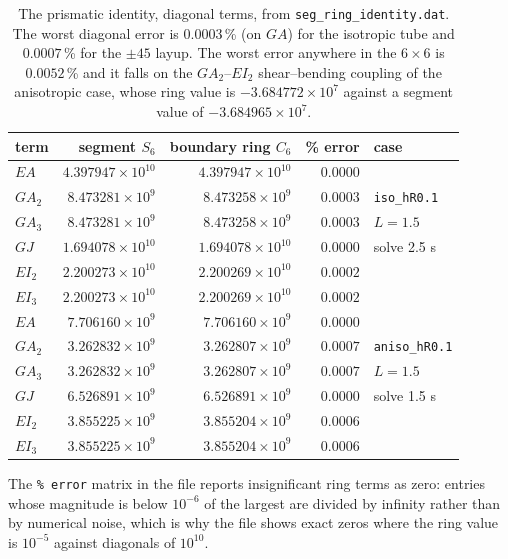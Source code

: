 \begin{table}[htbp]
\centering
\small
\begin{tabular}{lrrrl}
\toprule
term & segment $S_6$ & boundary ring $C_6$ & \% error & case \\
\midrule
$EA$   & $4.397947\times10^{10}$ & $4.397947\times10^{10}$ & $0.0000$ & \\
$GA_2$ & $8.473281\times10^{9}$  & $8.473258\times10^{9}$  & $0.0003$ & \texttt{iso\_hR0.1} \\
$GA_3$ & $8.473281\times10^{9}$  & $8.473258\times10^{9}$  & $0.0003$ & $L=1.5$ \\
$GJ$   & $1.694078\times10^{10}$ & $1.694078\times10^{10}$ & $0.0000$ & solve 2.5 s \\
$EI_2$ & $2.200273\times10^{10}$ & $2.200269\times10^{10}$ & $0.0002$ & \\
$EI_3$ & $2.200273\times10^{10}$ & $2.200269\times10^{10}$ & $0.0002$ & \\
\midrule
$EA$   & $7.706160\times10^{9}$  & $7.706160\times10^{9}$  & $0.0000$ & \\
$GA_2$ & $3.262832\times10^{9}$  & $3.262807\times10^{9}$  & $0.0007$ & \texttt{aniso\_hR0.1} \\
$GA_3$ & $3.262832\times10^{9}$  & $3.262807\times10^{9}$  & $0.0007$ & $L=1.5$ \\
$GJ$   & $6.526891\times10^{9}$  & $6.526891\times10^{9}$  & $0.0000$ & solve 1.5 s \\
$EI_2$ & $3.855225\times10^{9}$  & $3.855204\times10^{9}$  & $0.0006$ & \\
$EI_3$ & $3.855225\times10^{9}$  & $3.855204\times10^{9}$  & $0.0006$ & \\
\bottomrule
\end{tabular}
\caption{The prismatic identity, diagonal terms, from
\texttt{seg\_ring\_identity.dat}. The worst diagonal error is $0.0003$\,\% (on
$GA$) for the isotropic tube and $0.0007$\,\% for the $\pm45$ layup. The worst
error anywhere in the $6\times6$ is $0.0052$\,\% and it falls on the
$GA_2$--$EI_2$ shear--bending coupling of the anisotropic case, whose ring value
is $-3.684772\times10^{7}$ against a segment value of $-3.684965\times10^{7}$.}
\label{tab:seg-identity}
\end{table}

The \texttt{\% error} matrix in the file reports insignificant ring terms as
zero: entries whose magnitude is below $10^{-6}$ of the largest are divided by
infinity rather than by numerical noise, which is why the file shows exact zeros
where the ring value is $10^{-5}$ against diagonals of $10^{10}$.


